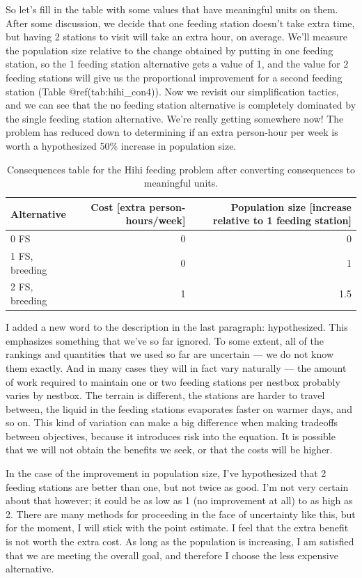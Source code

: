 \documentclass[]{book}
\begin{document}
So let's fill in the table with some values that have meaningful units
on them. After some discussion, we decide that one feeding station
doesn't take extra time, but having 2 stations to visit will take an
extra hour, on average. We'll measure the population size relative to
the change obtained by putting in one feeding station, so the 1 feeding
station alternative gets a value of 1, and the value for 2 feeding
stations will give us the proportional improvement for a second feeding
station (Table @ref(tab:hihi\_con4)). Now we revisit our simplification
tactics, and we can see that the no feeding station alternative is
completely dominated by the single feeding station alternative. We're
really getting somewhere now! The problem has reduced down to
determining if an extra person-hour per week is worth a hypothesized
50\% increase in population size.

\begin{table}[tbp]
\caption{Consequences table for the Hihi feeding problem after converting consequences to meaningful units.\label{tab:hihi_con4}}
\begin{tabulary}{0.7\textwidth}{lRR}
\toprule
   \textbf{Alternative}
  &\textbf{Cost [extra person-hours/week]}
  &\textbf{Population size [increase relative to 1 feeding station]}
\\ FS           & 0 & 0 
\\ 1 FS, breeding & 0 & 1 
\\ 2 FS, breeding & 1 & 1.5 
\\\bottomrule
\end{tabulary}
\end{table}

I added a new word to the description in the last paragraph:
hypothesized. This emphasizes something that we've so far ignored. To
some extent, all of the rankings and quantities that we used so far are
uncertain --- we do not know them exactly. And in many cases they will
in fact vary naturally --- the amount of work required to maintain one
or two feeding stations per nestbox probably varies by nestbox. The
terrain is different, the stations are harder to travel between, the
liquid in the feeding stations evaporates faster on warmer days, and so
on. This kind of variation can make a big difference when making
tradeoffs between objectives, because it introduces risk into the
equation. It is possible that we will not obtain the benefits we seek,
or that the costs will be higher.

In the case of the improvement in population size, I've hypothesized
that 2 feeding stations are better than one, but not twice as good. I'm
not very certain about that however; it could be as low as 1 (no
improvement at all) to as high as 2. There are many methods for
proceeding in the face of uncertainty like this, but for the moment, I
will stick with the point estimate. I feel that the extra benefit is not
worth the extra cost. As long as the population is increasing, I am
satisfied that we are meeting the overall goal, and therefore I choose
the less expensive alternative.
\end{document}
